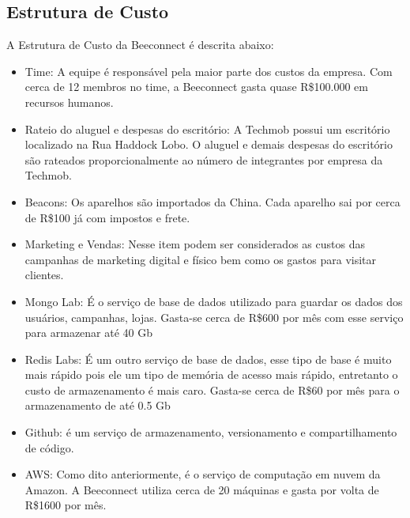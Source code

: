 \subsection{Estrutura de Custo}
\label{cha:estrutura_de_custo}
A Estrutura de Custo da Beeconnect é descrita abaixo:
\begin{itemize}
\item Time: A equipe é responsável pela maior parte dos custos da empresa. Com cerca de 12 membros no time, a Beeconnect gasta quase R\$100.000 em recursos humanos.
\item Rateio do aluguel e despesas do escritório: A Techmob possui um escritório localizado na Rua Haddock Lobo. O aluguel e demais despesas do escritório são rateados proporcionalmente ao número de integrantes por empresa da Techmob.
\item Beacons: Os aparelhos são importados da China. Cada aparelho sai por cerca de R\$100 já com impostos e frete.
\item Marketing e Vendas: Nesse item podem ser considerados as custos das campanhas de marketing digital e físico bem como os gastos para visitar clientes.
\item Mongo Lab: É o serviço de base de dados utilizado para guardar os dados dos usuários, campanhas, lojas. Gasta-se cerca de R\$600 por mês com esse serviço para armazenar até 40 Gb
\item Redis Labs: É um outro serviço de base de dados, esse tipo de base é muito mais rápido pois ele um tipo de memória de acesso mais rápido, entretanto o custo de armazenamento é mais caro. Gasta-se cerca de R\$60 por mês para o armazenamento de até 0.5 Gb
\item Github: é um serviço de armazenamento, versionamento e compartilhamento de código.
\item AWS: Como dito anteriormente, é o serviço de computação em nuvem da Amazon. A Beeconnect utiliza cerca de 20 máquinas e gasta por volta de R\$1600 por mês.
\end{itemize}

